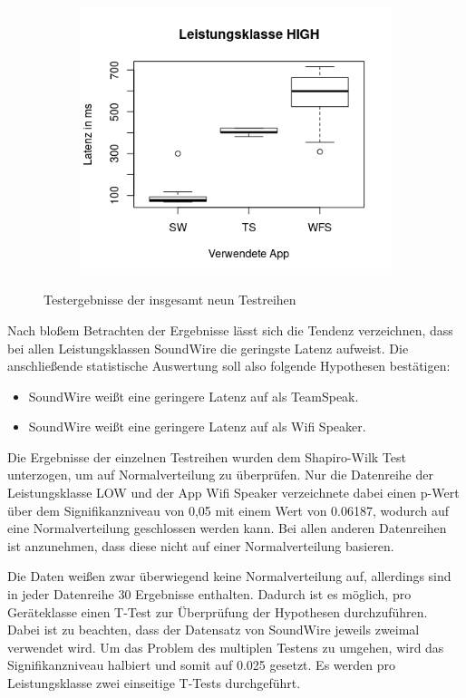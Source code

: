 \begin{figure}[h]
\begin{subfigure}[b]{0.5\textwidth}
\end{subfigure}
\begin{subfigure}[b]{0.5\textwidth}
\includegraphics[width=\textwidth]{img/boxplothigh.png}
\end{subfigure}
\caption{Testergebnisse der insgesamt neun Testreihen}
\label{boxplots}
\end{figure}

Nach bloßem Betrachten der Ergebnisse lässt sich die Tendenz verzeichnen, dass bei allen Leistungsklassen SoundWire die geringste Latenz aufweist. Die anschließende statistische Auswertung soll also folgende Hypothesen bestätigen:

\begin{itemize}
\item SoundWire weißt eine geringere Latenz auf als TeamSpeak.
\item SoundWire weißt eine geringere Latenz auf als Wifi Speaker.
\end{itemize}

Die Ergebnisse der einzelnen Testreihen wurden dem Shapiro-Wilk Test unterzogen, um auf Normalverteilung zu überprüfen. Nur die Datenreihe der Leistungsklasse LOW und der App Wifi Speaker verzeichnete dabei einen p-Wert über dem Signifikanzniveau von 0,05 mit einem Wert von 0.06187, wodurch auf eine Normalverteilung geschlossen werden kann. Bei allen anderen Datenreihen ist anzunehmen, dass diese nicht auf einer Normalverteilung basieren.

Die Daten weißen zwar überwiegend keine Normalverteilung auf, allerdings sind in jeder Datenreihe 30 Ergebnisse enthalten. Dadurch ist es möglich, pro Geräteklasse einen T-Test zur Überprüfung der Hypothesen durchzuführen. Dabei ist zu beachten, dass der Datensatz von SoundWire jeweils zweimal verwendet wird. Um das Problem des multiplen Testens zu umgehen, wird das Signifikanzniveau halbiert und somit auf 0.025 gesetzt. Es werden pro Leistungsklasse zwei einseitige T-Tests durchgeführt.

